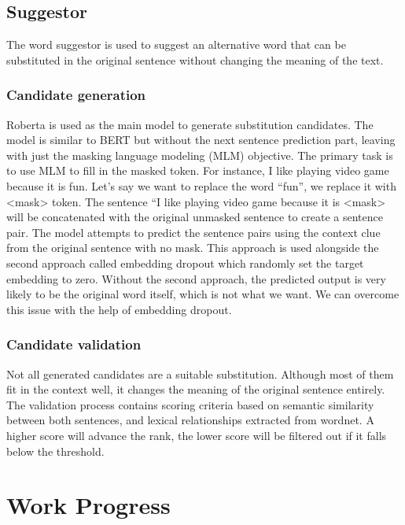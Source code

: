 \documentclass[12pt,oneside,openright,a4paper]{cpe-english-project}
\begin{document}
\section{Suggestor}
The word suggestor is used to suggest an alternative word that can be substituted in the original sentence without changing the meaning of the text. 
\subsection{Candidate generation}

	Roberta is used as the main model to generate substitution candidates. The model is similar to BERT but without the next sentence prediction part, leaving with just the masking language modeling (MLM) objective. The primary task is to use MLM to fill in the masked token. For instance, I like playing video game because it is fun. Let's say we want to replace the word “fun”, we replace it with <mask> token. The sentence “I like playing video game because it is <mask> will be concatenated with the original unmasked sentence to create a sentence pair. The model attempts to predict the sentence pairs using the context clue from the original sentence with no mask. This approach is used alongside the second approach called embedding dropout which randomly set the target embedding to zero. Without the second approach, the predicted output is very likely to be the original word itself, which is not what we want. We can overcome this issue with the help of embedding dropout.

\subsection{Candidate validation}

Not all generated candidates are a suitable substitution. Although most of them fit in the context well, it changes the meaning of the original sentence entirely. The validation process contains scoring criteria based on semantic similarity between both sentences, and lexical relationships extracted from wordnet. A higher score will advance the rank, the lower score will be filtered out if it falls below the threshold.

\chapter{Work Progress}
\end{document}

